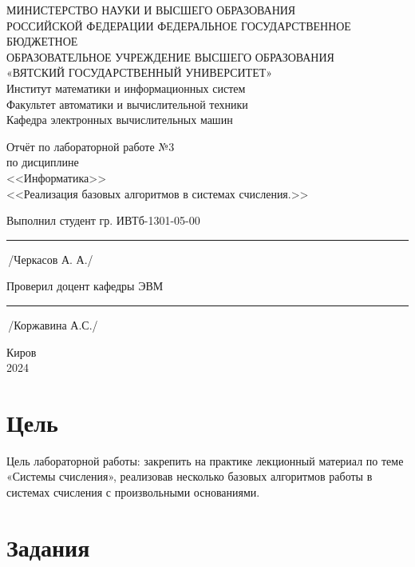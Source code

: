 \documentclass[oneside,a4paper,14pt]{extarticle} %
\begin{document}
\newpage\thispagestyle{empty}
\begin{center}
	МИНИСТЕРСТВО НАУКИ И ВЫСШЕГО ОБРАЗОВАНИЯ\\
	РОССИЙСКОЙ ФЕДЕРАЦИИ
	ФЕДЕРАЛЬНОЕ ГОСУДАРСТВЕННОЕ БЮДЖЕТНОЕ\\
	ОБРАЗОВАТЕЛЬНОЕ
	УЧРЕЖДЕНИЕ ВЫСШЕГО ОБРАЗОВАНИЯ\\
	«ВЯТСКИЙ ГОСУДАРСТВЕННЫЙ УНИВЕРСИТЕТ»\\
	Институт математики и информационных систем\\
	Факультет автоматики и вычислительной техники\\
	Кафедра электронных вычислительных машин
\end{center}
\vspace{20mm}

\begin{center}
	Отчёт по лабораторной работе №3\\
	по дисциплине\\
	<<Информатика>>\\
	<<Реализация базовых алгоритмов в системах счисления.>>\\
\end{center}
\vspace{48mm}

Выполнил студент гр. ИВТб-1301-05-00 \hspace{11mm} \rule[-0,5mm]{30mm}{0.15mm}\,/Черкасов А. А./


Проверил доцент кафедры ЭВМ \hfill  \rule[-0,5mm]{30mm}{0.15mm}\,/Коржавина А.С./

\vfill
\begin{center}
	Киров\\
	2024
\end{center}

\section*{Цель}

Цель лабораторной работы: закрепить на практике лекционный материал по теме «Системы счисления», реализовав несколько базовых алгоритмов работы в системах счисления с произвольными основаниями.

\section*{Задания}
\end{document}
